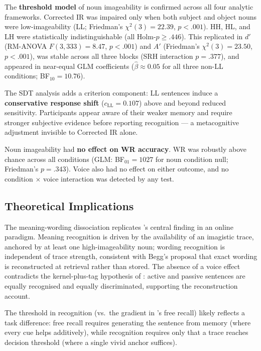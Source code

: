 \documentclass[12pt, a4paper]{article}
\begin{document}
The \textbf{threshold model} of noun imageability is confirmed across all
four analytic frameworks. Corrected IR was impaired only when both subject
and object nouns were low-imageability (LL; Friedman's $\chi^2(3) = 22.39$,
$p < .001$). HH, HL, and LH were statistically indistinguishable (all
Holm-$p \geq .446$). This replicated in $d'$ (RM-ANOVA $F(3,333) = 8.47$,
$p < .001$) and $A'$ (Friedman's $\chi^2(3) = 23.50$, $p < .001$), was
stable across all three blocks (SRH interaction $p = .377$), and appeared
in near-equal GLM coefficients ($\hat\beta \approx 0.05$ for all three
non-LL conditions; BF$_{10} = 10.76$).

The SDT analysis adds a criterion component: LL sentences induce a
\textbf{conservative response shift} ($c_{\text{LL}} = 0.107$) above
and beyond reduced sensitivity. Participants appear aware of their
weaker memory and require stronger subjective evidence before reporting
recognition --- a metacognitive adjustment invisible to Corrected IR alone.

Noun imageability had \textbf{no effect on WR accuracy}. WR was robustly
above chance across all conditions (GLM: BF$_{01} = 1027$ for noun
condition null; Friedman's $p = .343$). Voice also had no effect on
either outcome, and no condition $\times$ voice interaction was detected
by any test.

\subsection{Theoretical Implications}

The meaning-wording dissociation replicates \citet{begg1971}'s central
finding in an online paradigm. Meaning recognition is driven by the
availability of an imagistic trace, anchored by at least one
high-imageability noun; wording recognition is independent of trace
strength, consistent with Begg's proposal that exact wording is
reconstructed at retrieval rather than stored. The absence of a voice
effect contradicts the kernel-plus-tag hypothesis of \citet{bregman1968}:
active and passive sentences are equally recognised and equally
discriminated, supporting the reconstruction account.

The threshold in recognition (vs.\ the gradient in \citet{james1973}'s
free recall) likely reflects a task difference: free recall requires
generating the sentence from memory (where every cue helps additively),
while recognition requires only that a trace reaches decision threshold
(where a single vivid anchor suffices).
\end{document}

